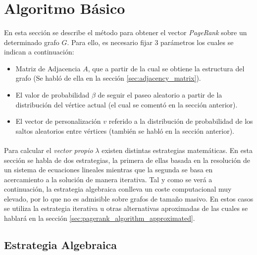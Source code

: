 \documentclass{subfiles}
\begin{document}
    \section{Algoritmo Básico}
    \label{sec:pagerank_algorithm}

      \paragraph{}
      En esta sección se describe el método para obtener el vector \emph{PageRank} sobre un determinado grafo $G$. Para ello, es necesario fijar 3 parámetros los cuales se indican a continuación:
      \begin{itemize}
        \item Matriz de Adjacencia $A$, que a partir de la cual se obtiene la estructura del grafo (Se habló de ella en la sección \ref{sec:adjacency_matrix}).
        \item El valor de probabilidad $\beta$ de seguir el paseo aleatorio a partir de la distribución del vértice actual (el cual se comentó en la sección anterior).
        \item El vector de personalización $v$ referido a la distribución de probabilidad de los saltos aleatorios entre vértices (también se habló en la sección anterior).
      \end{itemize}



      \paragraph{}
      Para calcular el \emph{vector propio} $\lambda$ existen distintas estrategias matemáticas. En esta sección se habla de dos estrategias, la primera de ellas basada en la resolución de un sistema de ecuaciones lineales mientras que la segunda se basa en acercamiento a la solución de manera iterativa. Tal y como se verá a continuación, la estrategia algebraica conlleva un coste computacional muy elevado, por lo que no es admisible sobre grafos de tamaño masivo. En estos casos se utiliza la estrategia iterativa u otras alternativas aproximadas de las cuales se hablará en la sección \ref{sec:pagerank_algorithm_approximated}.


      \subsection{Estrategia Algebraica}
      \label{sec:pagerank_algorithm_algebraic}
\end{document}
